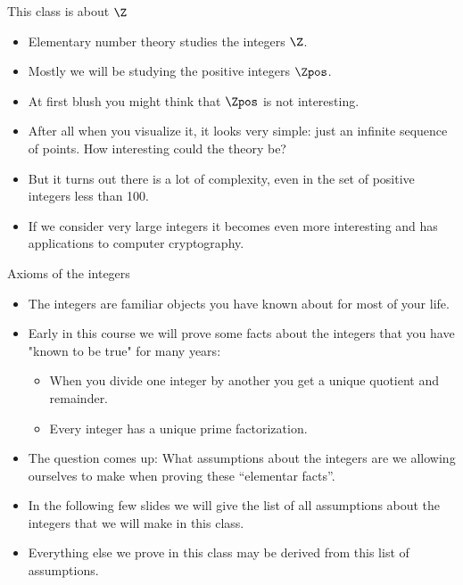 \documentclass{beamer}
\begin{document}
\begin{frame}{This class is about $\Z$}

\begin{itemize}
\item Elementary number theory studies the integers $\Z$.
\item Mostly we will be studying the positive integers $\Zpos$.
\item At first blush you might think that $\Zpos$ is not interesting.
\item After all when you visualize it, it looks very simple: just an infinite sequence of points.
How interesting could the theory be?
\item But it turns out there is a lot of complexity, even in the set of positive integers less than 100.
\item If we consider very large integers it becomes even more interesting and has applications
to computer cryptography.
\end{itemize}
\end{frame}

\begin{frame}{Axioms of the integers}

\begin{itemize}
  \item The integers are familiar objects you have known about for most of your life.
  \item Early in this course we will prove some facts about the integers
  that you have "known to be true" for many years:
  \begin{itemize}
    \item When you divide one integer by another you get a unique quotient and remainder.
    \item Every integer has a unique prime factorization.
  \end{itemize}
  \item The question comes up: What assumptions about the integers are we allowing
  ourselves to make when proving these ``elementar facts''.
  \item In the following few slides we will give the list of all assumptions
  about the integers that we will make in this class.
  \item Everything else we prove in this class may be derived from this list of assumptions.
\end{itemize}
\end{frame}
\end{document}
